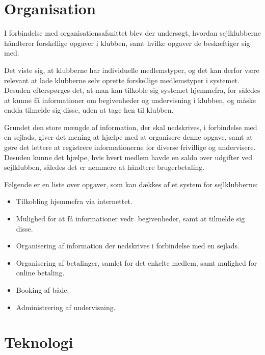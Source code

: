 \section{Organisation}

I forbindelse med organisationsafsnittet blev der undersøgt, hvordan sejlklubberne håndterer forskellige opgaver i klubben, samt hvilke opgaver de beskæftiger sig med.

Det viste sig, at klubberne har individuelle medlemstyper, og det kan derfor være relevant at lade klubberne selv oprette forskellige medlemstyper i systemet. 
Desuden efterspørges det, at man kan tilkoble sig systemet hjemmefra, for således at kunne få informationer om begivenheder og undervisning i klubben, og måske endda tilmelde sig disse, uden at tage hen til klubben.

Grundet den store mængde af information, der skal nedskrives, i forbindelse med en sejlads, giver det mening at hjælpe med at organisere denne opgave, samt at gøre det lettere at registrere informationerne for diverse frivillige og undervisere. 
Desuden kunne det hjælpe, hvis hvert medlem havde en saldo over udgifter ved sejlklubben, således det er nemmere at håndtere brugerbetaling.

Følgende er en liste over opgaver, som kan dækkes af et system for sejlklubberne:

\begin{itemize}
  \item Tilkobling hjemmefra via internettet.
  \item Mulighed for at få informationer vedr. begivenheder, samt at tilmelde sig disse.
  \item Organisering af information der nedskrives i forbindelse med en sejlads.
  \item Organisering af betalinger, samlet for det enkelte medlem, samt mulighed for online betaling.
  \item Booking af både.
  \item Administrering af undervisning.
\end{itemize}


\section{Teknologi}

